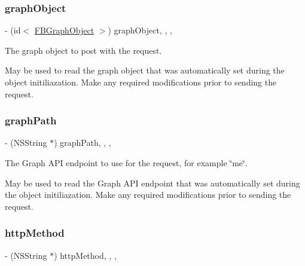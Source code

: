 \mbox{\label{interfaceFBRequest_ae7e1b415ae4b2da5173c8ba545577feb}} 
\subsubsection{\texorpdfstring{graph\+Object}{graphObject}}
{\footnotesize\ttfamily -\/ (id$<$ \hyperlink{interfaceFBGraphObject}{F\+B\+Graph\+Object} $>$) graph\+Object\hspace{0.3cm}{\ttfamily [read]}, {\ttfamily [write]}, {\ttfamily [nonatomic]}, {\ttfamily [retain]}}

The graph object to post with the request.

May be used to read the graph object that was automatically set during the object initiliazation. Make any required modifications prior to sending the request. \mbox{\label{interfaceFBRequest_a0bd3f881663e33c43fbf4206f1c970ab}} 
\subsubsection{\texorpdfstring{graph\+Path}{graphPath}}
{\footnotesize\ttfamily -\/ (N\+S\+String $\ast$) graph\+Path\hspace{0.3cm}{\ttfamily [read]}, {\ttfamily [write]}, {\ttfamily [nonatomic]}, {\ttfamily [copy]}}

The Graph A\+PI endpoint to use for the request, for example \char`\"{}me\char`\"{}.

May be used to read the Graph A\+PI endpoint that was automatically set during the object initiliazation. Make any required modifications prior to sending the request. \mbox{\label{interfaceFBRequest_af74fe5bc235b8895dbe0f051239649d6}} 
\subsubsection{\texorpdfstring{http\+Method}{httpMethod}}
{\footnotesize\ttfamily -\/ (N\+S\+String $\ast$) http\+Method\hspace{0.3cm}{\ttfamily [read]}, {\ttfamily [write]}, {\ttfamily [nonatomic]}, {\ttfamily [copy]}}

